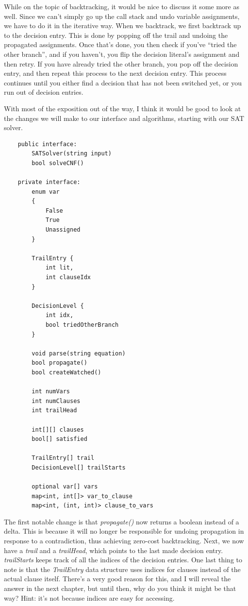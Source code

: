 While on the topic of backtracking, it would be nice to discuss it some more as well. 
Since we can't simply go up the call stack and undo variable assignments, we have to 
do it in the iterative way. When we backtrack, we first backtrack up to the decision
entry. This is done by popping off the trail and undoing the propagated assignments. 
Once that's done, you then check if you've ``tried the other branch'', and if you 
haven't, you flip the decision literal's assignment and then retry. If you have 
already tried the other branch, you pop off the decision entry, and then repeat 
this process to the next decision entry. This process continues until you either 
find a decision that has not been switched yet, or you run out of decision 
entries.

With most of the exposition out of the way, I think it would be good to 
look at the changes we will make to our interface and algorithms, starting 
with our SAT solver.

\begin{lstlisting}
    public interface:
        SATSolver(string input)
        bool solveCNF()

    private interface:
        enum var
        {
            False
            True
            Unassigned
        }

        TrailEntry {
            int lit,
            int clauseIdx
        }

        DecisionLevel {
            int idx,
            bool triedOtherBranch
        }

        void parse(string equation)
        bool propagate()
        bool createWatched()

        int numVars
        int numClauses
        int trailHead

        int[][] clauses
        bool[] satisfied
        
        TrailEntry[] trail
        DecisionLevel[] trailStarts

        optional var[] vars
        map<int, int[]> var_to_clause
        map<int, (int, int)> clause_to_vars
\end{lstlisting}

The first notable change is that \textit{propagate()} now returns a boolean instead 
of a delta. This is because it will no longer be responsible for undoing propagation 
in response to a contradiction, thus achieving zero-cost backtracking. Next, 
we now have a \textit{trail} and a \textit{trailHead}, which points to the last 
made decision entry. \textit{trailStarts} keeps track of all the indices of the 
decision entries. One last thing to note is that the \textit{TrailEntry} data 
structure uses indices for clauses instead of the actual clause itself. 
There's a very good reason for this, and I will reveal the answer in the next chapter,
but until then, why do you think it might be that way? Hint: it's not because 
indices are easy for accessing. 


